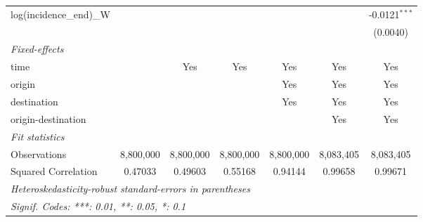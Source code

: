 \documentclass[10pt,a4paper]{article}
\begin{document}
\begin{tabular}{lcccccc}
   log(incidence\_end)\_W                       &                &                &                 &                &                 & -0.0121$^{***}$\\   
                                                &                &                &                 &                &                 & (0.0040)\\   
   \midrule
   \emph{Fixed-effects}\\
   time                                         &                & Yes            & Yes             & Yes            & Yes             & Yes\\  
   origin                                       &                &                &                 & Yes            & Yes             & Yes\\  
   destination                                  &                &                &                 & Yes            & Yes             & Yes\\  
   origin-destination                           &                &                &                 &                & Yes             & Yes\\  
   \midrule
   \emph{Fit statistics}\\
   Observations                                 & 8,800,000      & 8,800,000      & 8,800,000       & 8,800,000      & 8,083,405       & 8,083,405\\  
   Squared Correlation                          & 0.47033        & 0.49603        & 0.55168         & 0.94144        & 0.99658         & 0.99671\\  
   \midrule \midrule
   \multicolumn{7}{l}{\emph{Heteroskedasticity-robust standard-errors in parentheses}}\\
   \multicolumn{7}{l}{\emph{Signif. Codes: ***: 0.01, **: 0.05, *: 0.1}}\\
\end{tabular}
\par\endgroup
\end{document}
